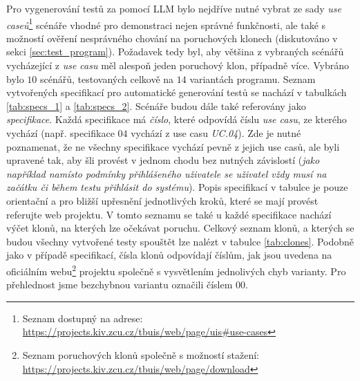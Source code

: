 \documentclass[czech, ma, kiv, he, iso690numb, pdf, viewonly]{fasthesis}
\begin{document}
    Pro vygenerování testů za pomocí LLM bylo nejdříve nutné vybrat ze sady \textit{use caseů}\footnote{Seznam dostupný na adrese: \url{https://projects.kiv.zcu.cz/tbuis/web/page/uis#use-cases}} scénáře vhodné pro demonstraci nejen správné funkčnosti, ale také s možností ověření nesprávného chování na poruchových klonech (diskutováno v sekci \ref{sec:test_program}). Požadavek tedy byl, aby většina z vybraných scénářů vycházející z \textit{use casu} měl alespoň jeden poruchový klon, případně více. Vybráno bylo \(10\) scénářů, testovaných celkově na \(14\) variantách programu. Seznam vytvořených specifikací pro automatické generování testů se nachází v tabulkách \ref{tab:specs_1} a \ref{tab:specs_2}. Scénáře budou dále také referovány jako \textit{specifikace}. Každá specifikace má \textit{číslo}, které odpovídá číslu \textit{use casu}, ze kterého vychází (např. specifikace \(04\) vychází z use casu \textit{UC.04}). Zde je nutné poznamenat, že ne všechny specifikace vychází pevně z jejich use casů, ale byli upravené tak, aby šli provést v jednom chodu bez nutných závislostí (\textit{jako například namísto podmínky přihlášeného uživatele se uživatel vždy musí na začátku či během testu přihlásit do systému}). Popis specifikací v tabulce je pouze orientační a pro bližší upřesnění jednotlivých kroků, které se mají provést referujte web projektu. V tomto seznamu se také u každé specifikace nachází výčet klonů, na kterých lze očekávat poruchu. Celkový seznam klonů, a kterých se budou všechny vytvořené testy spouštět lze nalézt v tabulce \ref{tab:clones}. Podobně jako v případě specifikací, čísla klonů odpovídají číslům, jak jsou uvedena na oficiálním webu\footnote{Seznam poruchových klonů společně s možností stažení: \url{https://projects.kiv.zcu.cz/tbuis/web/page/download}} projektu společně s vysvětlením jednolivých chyb varianty. Pro přehlednost jsme bezchybnou variantu označili číslem \(00\).
\end{document}
